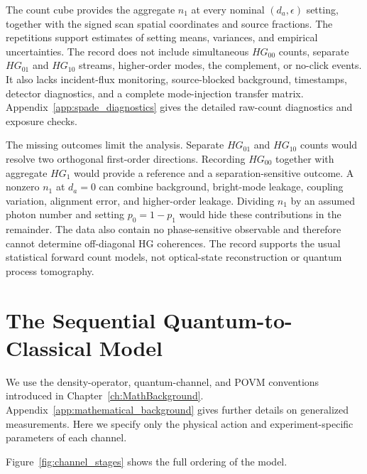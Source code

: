 The count cube provides the aggregate $n_1$ at every nominal $(d_a,\epsilon)$ setting, together with the signed scan spatial coordinates and source fractions.  The repetitions support estimates of setting means, variances, and empirical uncertainties.  The record does not include simultaneous $HG_{00}$ counts, separate $HG_{01}$ and $HG_{10}$ streams, higher-order modes, the complement, or no-click events.  It also lacks incident-flux monitoring, source-blocked background, timestamps, detector diagnostics, and a complete mode-injection transfer matrix.  Appendix~\ref{app:spade_diagnostics} gives the detailed raw-count diagnostics and exposure checks.

The missing outcomes limit the analysis.  Separate $HG_{01}$ and $HG_{10}$ counts would resolve two orthogonal first-order directions.  Recording $HG_{00}$ together with aggregate $HG_1$ would provide a reference and a separation-sensitive outcome.  A nonzero $n_1$ at $d_a=0$ can combine background, bright-mode leakage, coupling variation, alignment error, and higher-order leakage.  Dividing $n_1$ by an assumed photon number and setting $p_0=1-p_1$ would hide these contributions in the remainder.  The data also contain no phase-sensitive observable and therefore cannot determine off-diagonal HG coherences.  The record supports the usual statistical forward count models, not optical-state reconstruction or quantum process tomography.

\section{The Sequential Quantum-to-Classical Model}
\label{sec:spade_sequential_channels}

We use the density-operator, quantum-channel, and POVM conventions introduced in Chapter~\ref{ch:MathBackground}.  Appendix~\ref{app:mathematical_background} gives further details on generalized measurements.  Here we specify only the physical action and experiment-specific parameters of each channel.

Figure~\ref{fig:channel_stages} shows the full ordering of the model.

